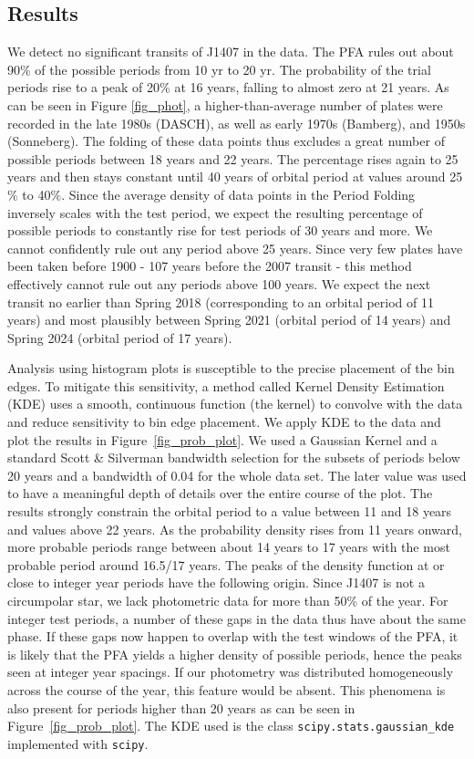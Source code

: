 \documentclass[twocolumn]{aa}
\begin{document}
\subsection{Results}
We detect no significant transits of J1407 in the data.
%
The PFA rules out about 90\% of the possible periods from 10 yr to 20 yr.
%
The probability of the trial periods rise to a peak of 20\% at 16 years, falling to almost zero at 21 years.
%
As can be seen in Figure \ref{fig_phot}, a higher-than-average number of plates were recorded in the late 1980s (DASCH), as well as early 1970s (Bamberg), and 1950s (Sonneberg).
%
The folding of these data points thus excludes a great number of possible periods between 18 years and 22 years.
%
The percentage rises again to 25 years and then stays constant until 40 years of orbital period at values around 25$\%$ to 40$\%$.
%
Since the average density of data points in the Period Folding inversely scales with the test period, we expect the resulting percentage of possible periods to constantly rise for test periods of 30 years and more.
%
We cannot confidently rule out any period above 25 years.
%
Since very few plates have been taken before 1900 - 107 years before the 2007 transit - this method effectively cannot rule out any periods above 100 years.
%
We expect the next transit no earlier than Spring 2018 (corresponding to an orbital period of 11 years) and most plausibly between Spring 2021 (orbital period of 14 years) and Spring 2024 (orbital period of 17 years).

Analysis using histogram plots is susceptible to the precise placement of the bin edges.
%
To mitigate this sensitivity, a method called Kernel Density Estimation (KDE) uses a smooth, continuous function (the kernel) to convolve with the data and reduce sensitivity to bin edge placement.
%
We apply KDE to the data and plot the results in Figure~\ref{fig_prob_plot}. 
%
We used a Gaussian Kernel and a standard Scott \& Silverman bandwidth selection for the subsets of periods below 20 years and a bandwidth of 0.04 for the whole data set.
%
The later value was used to have a meaningful depth of details over the entire course of the plot.
%
The results strongly constrain the orbital period to a value between 11 and 18 years and values above 22 years.
%
As the probability density rises from 11 years onward, more probable periods range between about 14 years to 17 years with the most probable period around 16.5/17 years.
%
The peaks of the density function at or close to integer year periods have the following origin.
%
Since J1407 is not a circumpolar star, we lack photometric data for more than 50\% of the year.
%
For integer test periods, a number of these gaps in the data thus have about the same phase.
%
If these gaps now happen to overlap with the test windows of the PFA, it is likely that the PFA yields a higher density of possible periods, hence the peaks seen at integer year spacings.
%
If our photometry was distributed homogeneously across the course of the year, this feature would be absent.
%
This phenomena is also present for periods higher than 20 years as can be seen in Figure~\ref{fig_prob_plot}.
%
The KDE used is the class {\tt scipy.stats.gaussian\_kde} implemented with {\tt scipy}.
\end{document}
